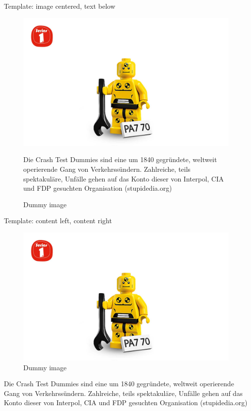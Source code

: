 \documentclass[shortpres]{beamer}
\newcommand{\imgvoffset}{-20pt}
\newcommand{\imgfullscale}{0.75}
\begin{document}

\begin{frame}{Template: image centered, text below}
	\begin{figure}[t]
		\vspace{\imgvoffset}
		\includegraphics[clip, width=\imgfullscale\linewidth]{img/dummy_image.jpg}
		\caption*{Dummy image}
		Die Crash Test Dummies sind eine um 1840 gegründete, weltweit operierende Gang von Verkehrssündern. Zahlreiche, teils spektakuläre, Unfälle gehen auf das Konto dieser von Interpol, CIA und FDP gesuchten Organisation (stupidedia.org)
	\end{figure}
\end{frame}

\begin{frame}{Template: content left, content right}
	\begin{multicols}{2}
		\begin{figure}[t]
			\includegraphics[clip, width=0.98\linewidth]{img/dummy_image.jpg}
			\caption*{Dummy image}
		\end{figure}		
		
	\columnbreak
	
		Die Crash Test Dummies sind eine um 1840 gegründete, weltweit operierende Gang von Verkehrssündern. Zahlreiche, teils spektakuläre, Unfälle gehen auf das Konto dieser von Interpol, CIA und FDP gesuchten Organisation (stupidedia.org)
	\end{multicols}
\end{frame}
\end{document}
